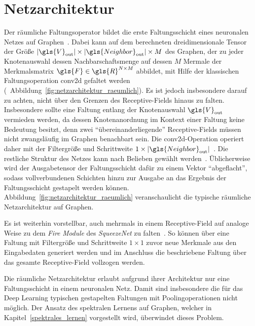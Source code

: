 \section{Netzarchitektur}
\label{raeumliche_netzarchitektur}

Der räumliche Faltungsoperator bildet die erste Faltungsschicht eines neuronalen Netzes auf Graphen~\cite{patchy}.
Dabei kann auf dem berechneten dreidimensionale Tensor der Größe $\left|\gls{V}_{\mathrm{out}}\right| \times \left|\gls{Neighbor}_{\mathrm{out}}\right| \times M$ des Graphen, der zu jeder Knotenauswahl dessen Nachbarschaftsmenge auf dessen $M$ Mermale der Merkmalsmatrix $\gls{F} \in \gls{R}^{N \times M}$ abbildet, mit Hilfe der klassischen Faltungsoperation \gls{conv2d} gefaltet werden (\vgl{}~Abbildung~\ref{fig:netzarchitektur_raeumlich}).
Es ist jedoch insbesondere darauf zu achten, nicht über den Grenzen des Receptive-Fields hinaus zu falten.
Insbesondere sollte eine Faltung entlang der Knotenauswahl $\gls{V}_{\mathrm{out}}$ vermieden werden, da dessen Knotenanordnung im Kontext einer Faltung keine Bedeutung besitzt, denn zwei \enquote{übereinanderliegende} Receptive-Fields müssen nicht zwangsläufig im Graphen benachbart sein.
Die \gls{conv2d}-Operation operiert daher mit der Filtergröße und Schrittweite $1 \times \left|\gls{Neighbor}_{\mathrm{out}}\right|$~\cite{patchy}.
Die restliche Struktur des Netzes kann nach Belieben gewählt werden~\cite{patchy}.
Üblicherweise wird der Ausgabetensor der Faltungsschicht dafür zu einem Vektor \enquote{abgeflacht}, sodass vollverbundenen Schichten hinzu zur Ausgabe an das Ergebnis der Faltungsschicht gestapelt werden können.
Abbildung~\ref{fig:netzarchitektur_raeumlich} veranschaulicht die typische räumliche Netzarchitektur auf Graphen.


Es ist weiterhin vorstellbar, auch mehrmals in einem Receptive-Field auf analoge Weise zu dem \emph{Fire Module} des \emph{SqueezeNet} zu falten~\cite{squeeze}.
So können \zB{} über eine Faltung mit Filtergröße und Schrittweite $1 \times 1$ zuvor neue Merkmale aus den Eingabedaten generiert werden und im Anschluss die beschriebene Faltung über das gesamte Receptive-Field vollzogen werden.

Die räumliche Netzarchitektur erlaubt aufgrund ihrer Architektur nur eine Faltungsschicht in einem neuronalen Netz.
Damit sind insbesondere die für das Deep Learning typischen gestapelten Faltungen mit Poolingoperationen nicht möglich.
Der Ansatz des spektralen Lernens auf Graphen, welcher in Kapitel~\ref{spektrales_lernen} vorgestellt wird, überwindet dieses Problem.

